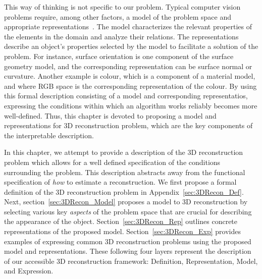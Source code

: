 
This way of thinking is not specific to our problem. Typical computer vision problems require, among other factors, a model of the problem space and appropriate representations~\cite{little1985phdthesis}. The model characterizes the relevant properties of the elements in the domain and analyze their relations. The representations describe an object's properties selected by the model to facilitate a solution of the problem. For instance, surface orientation is one component of the surface geometry model, and the corresponding representation can be surface normal or curvature. Another example is colour, which is a component of a material model, and where RGB space is the corresponding representation of the colour. By using this formal description consisting of a model and corresponding representatios, expressing the conditions within which an algorithm works reliably becomes more well-defined. Thus, this chapter is devoted to proposing a model and representations for 3D reconstruction problem, which are the key components of the interpretable description.

In this chapter, we attempt to provide a description of the 3D reconstruction problem which allows for a well defined specification of the conditions surrounding the problem. This description abstracts away from the functional specification of \textit{how} to estimate a reconstruction. We first propose a formal definition of the 3D reconstruction problem in Appendix~\ref{sec:3DRecon_Def}. Next, section~\ref{sec:3DRecon_Model} proposes a model to 3D reconstruction by selecting various key \textit{aspects} of the problem space that are crucial for describing the appearance of the object. Section~\ref{sec:3DRecon_Rep} outlines concrete representations of the proposed model. Section~\ref{sec:3DRecon_Exp} provides examples of expressing common 3D reconstruction problems using the proposed model and representations. These following four layers represent the description of our accessible 3D reconstruction framework: Definition, Representation, Model, and Expression.

